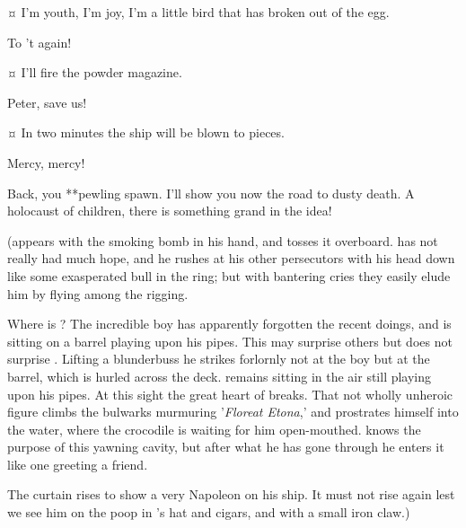 \begin{drama}

\peterspeaks {}¤
I'm youth, I'm joy, I'm a little bird that has broken out of the egg.

\hookspeaks
To 't again!


\hookspeaks {}¤
I'll fire the powder magazine.

Peter, save us!


\hookspeaks {}¤
In two minutes the ship will be blown to pieces.


Mercy, mercy!

\hookspeaks
Back, you **pewling spawn.
I'll show you now the road to dusty death.
A holocaust of children, there is something grand in the idea!

\begin{stagedir}
(\peter appears with the smoking bomb in his hand, and tosses it overboard.
\hook has not really had much hope,
and he rushes at his other persecutors with his head down like some exasperated bull in the ring;
but with bantering cries they easily elude him by flying among the rigging.

Where is \peter?
The incredible boy has apparently forgotten the recent doings,
and is sitting on a barrel playing upon his pipes.
This may surprise others but does not surprise \hook.
Lifting a blunderbuss he strikes forlornly
not at the boy but at the barrel, which is hurled across the deck.
\peter remains sitting in the air still playing upon his pipes.
At this sight the great heart of \hook breaks.
That not wholly unheroic figure climbs the bulwarks murmuring '\emph{Floreat Etona},'
and prostrates himself into the water, where the crocodile is waiting for him open-mouthed.
\hook knows the purpose of this yawning cavity,
but after what he has gone through he enters it like one greeting a friend.

The curtain rises to show \peter a very Napoleon on his ship.
It must not rise again lest we see him on the poop in \hook's hat and cigars,
and with a small iron claw.)
\end{stagedir}

\end{drama}

\endinput
